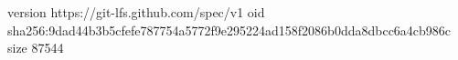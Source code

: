 version https://git-lfs.github.com/spec/v1
oid sha256:9dad44b3b5cfefe787754a5772f9e295224ad158f2086b0dda8dbcc6a4cb986c
size 87544
